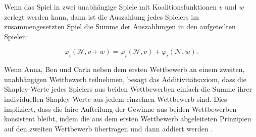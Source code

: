 Wenn das Spiel in zwei unabhängige Spiele mit Koalitionsfunktionen $v$ und $w$ zerlegt werden kann, dann ist die Auszahlung jedes Spielers im 
zusammengesetzten Spiel die Summe der Auszahlungen in den aufgeteilten Spielen:

\begin{equation}
\varphi_i (\mathcal{N}, v + w) = \varphi_i (\mathcal{N}, v) + \varphi_i (\mathcal{N}, w).
\end{equation}

Wenn Anna, Ben und Carla neben dem ersten Wettbewerb an einem zweiten, unabhängigen Wettbewerb teilnehmen, 
besagt das Additivitätsaxiom, dass die Shapley-Werte jedes Spielers aus beiden Wettbewerben einfach die Summe ihrer individuellen 
Shapley-Werte aus jedem einzelnen Wettbewerb sind. Dies impliziert, dass die faire Aufteilung der Gewinne aus beiden Wettbewerben 
konsistent bleibt, indem die aus dem ersten Wettbewerb abgeleiteten Prinzipien auf den zweiten Wettbewerb übertragen und 
dann addiert werden \cite[S. 5573, S.22f]{ijcai2022p778, Molnar_2022}.